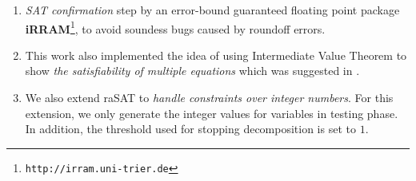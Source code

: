 \begin{enumerate}
\begin{comment}
\end{comment}
\item \emph{SAT confirmation} step by an error-bound guaranteed floating point package {\bf iRRAM}\footnote{%
\tt http://irram.uni-trier.de}, to avoid soundess bugs caused by roundoff errors.
\item This work also implemented the idea of using Intermediate Value Theorem to show \emph{the satisfiability of multiple equations} which was suggested in \cite{VanKhanh201227}.
\item We also extend raSAT to \emph{handle constraints over integer numbers}. For this extension, we only generate the integer values for variables in testing phase. In addition, the threshold used for stopping decomposition is set to $1$.
\end{enumerate}
\begin{comment}
\subsection{Inequalities}
Constraints with inequalities can be categorized into four cases:
\begin{enumerate}
\item \textbf{SAT with without touching}
\begin{figure}[ht]
\centering
\texttt{[image: SAT-withoutTouching.png]} 
\caption{SAT without touching dectected by ICP} 
\label{fig:sat-withoutTouching} 
\end{figure} 

\item \textbf{SAT/UNSAT with touching/convergence}
\begin{figure}[ht]
\centering
\texttt{[image: SAT-touching.png]} 
\caption{SAT(UNSAT) detected by Grobner basis method} 
\label{fig:sat-touching} 
\end{figure} 

\item \textbf{UNSAT without touching/convergence}
\begin{figure}[ht]
\centering
\texttt{[image: UNSAT-withoutTouching.png]} 
\caption{UNSAT detected by ICP} 
\label{fig:unsat-withoutTouching} 
\end{figure} 
\end{enumerate}
\end{comment}
